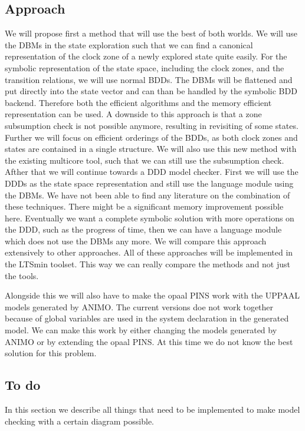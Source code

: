 \documentclass[11pt]{article}
\begin{document}
\subsection{Approach}
We will propose first a method that will use the best of both worlds. We will use the DBMs in the state exploration such that we can find a canonical representation of the clock zone of a newly explored state quite easily. For the symbolic representation of the state space, including the clock zones, and the transition relations, we will use normal BDDs. The DBMs will be flattened and put directly into the state vector and can than be handled by the symbolic BDD backend. Therefore both the efficient algorithms and the memory efficient representation can be used. A downside to this approach is that a zone subsumption check is not possible anymore, resulting in revisiting of some states. Further we will focus on efficient orderings of the BDDs, as both clock zones and states are contained in a single structure. We will also use this new method with the existing multicore tool, such that we can still use the subsumption check. Afther that we will continue towards a DDD model checker. First we will use the DDDs as the state space representation and still use the language module using the DBMs. We have not been able to find any literature on the combination of these techniques. There might be a significant memory improvement possible here. Eventually we want a complete symbolic solution with more operations on the DDD, such as the progress of time, then we can have a language module which does not use the DBMs any more. We will compare this approach extensively to other approaches. All of these approaches will be implemented in the LTSmin toolset. This way we can really compare the methods and not just the tools.

Alongside this we will also have to make the opaal PINS work with the UPPAAL models generated by ANIMO. The current versions doe not work together because of global variables are used in the system declaration in the generated model. We can make this work by either changing the models generated by ANIMO or by extending the opaal PINS. At this time we do not know the best solution for this problem.

\subsection{To do}
In this section we describe all things that need to be implemented to make model checking with a certain diagram possible. 
\end{document}
